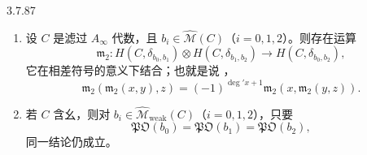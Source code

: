\begin{proposition}{3.7.87}\label{prop:3-7-87}
\begin{enumerate}[label=\textup{(\arabic*)},leftmargin=2.8em]
 \item 设 $C$ 是滤过 $A_\infty$ 代数，且
 $b_i\in\widehat{\mathcal M}(C)$（$i=0,1,2$）。则存在运算
 \begin{equation}
  \mathfrak m_2\colon
  H(C,\delta_{b_0,b_1})\otimes H(C,\delta_{b_1,b_2})
  \longrightarrow H(C,\delta_{b_0,b_2}),
 \tag{3.7.88}\label{eq:3-7-88}
 \end{equation}
 它在相差符号的意义下结合；也就是说
 ，
 \begin{equation}
  \mathfrak m_2(\mathfrak m_2(x,y),z)
  =
  (-1)^{\deg' x+1}\mathfrak m_2(x,\mathfrak m_2(y,z)).
 \tag{3.7.89}\label{eq:3-7-89}
 \end{equation}

 \item 若 $C$ 含幺，则对
 $b_i\in\widehat{\mathcal M}_{\mathrm{weak}}(C)$（$i=0,1,2$），只要
 \[
  \mathfrak{PO}(b_0)=\mathfrak{PO}(b_1)=\mathfrak{PO}(b_2),
 \]
 同一结论仍成立。
\end{enumerate}
\end{proposition}

